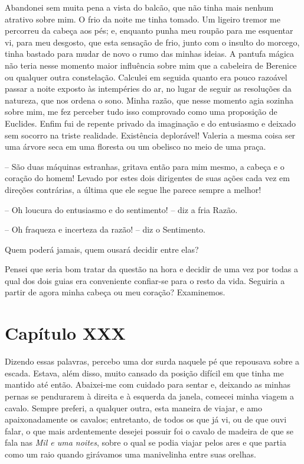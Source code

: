  Abandonei sem muita pena a vista do balcão, que não tinha mais nenhum
atrativo sobre mim. O frio da noite me tinha tomado. Um ligeiro tremor
me percorreu da cabeça aos pés; e, enquanto punha meu roupão para me
esquentar vi, para meu desgosto, que esta sensação de frio, junto com o
insulto do morcego, tinha bastado para mudar de novo o rumo das minhas
ideias. A pantufa mágica não teria nesse momento maior influência sobre
mim que a cabeleira de Berenice ou qualquer outra constelação. Calculei
em seguida quanto era pouco razoável passar a noite exposto às
intempéries do ar, no lugar de seguir as resoluções da natureza, que
nos ordena o sono. Minha razão, que nesse momento agia sozinha sobre
mim, me fez perceber tudo isso comprovado como uma proposição de
Euclides. Enfim fui de repente privado da imaginação e do entusiasmo e
deixado sem socorro na triste realidade. Existência deplorável! Valeria
a mesma coisa ser uma árvore seca em uma floresta ou um obelisco no
meio de uma praça.

 -- São duas máquinas estranhas, gritava então para mim mesmo, a cabeça
e o coração do homem! Levado por estes dois dirigentes de suas ações
cada vez em direções contrárias, a última que ele segue lhe parece
sempre a melhor! 

-- Oh loucura do entusiasmo e do sentimento! -- diz a fria Razão.

-- Oh fraqueza e incerteza da razão! -- diz o Sentimento. 

Quem poderá jamais, quem ousará decidir entre elas?

Pensei que seria bom tratar da questão na hora e decidir de uma vez por
todas a qual dos dois guias era conveniente confiar-se para o resto da
vida. Seguiria a partir de agora minha cabeça ou meu coração?
Examinemos.

\section*{Capítulo XXX}

 Dizendo essas palavras, percebo uma dor surda naquele pé que repousava
sobre a escada. Estava, além disso, muito cansado da posição difícil em
que tinha me mantido até então. Abaixei-me com cuidado para sentar e,
deixando as minhas pernas se pendurarem à direita e à esquerda da
janela, comecei minha viagem a cavalo. Sempre preferi, a qualquer
outra, esta maneira de viajar, e amo apaixonadamente os cavalos;
entretanto, de todos os que já vi, ou de que ouvi falar, o que mais
ardentemente desejei possuir foi o cavalo de madeira de que se fala nas
\textit{Mil e uma noites}, sobre o qual se podia viajar pelos ares e
que partia como um raio quando girávamos uma manivelinha entre suas
orelhas.

